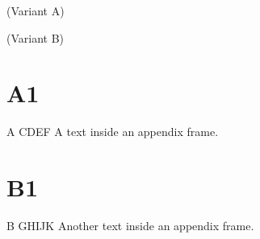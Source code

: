 \documentclass[]{beamer}
\begin{document}
%
%
\appendix

\begin{frame}[plain]{\appendixname{} (Variant A)}
	\centering
	\appendixname
\end{frame}

\begin{frame}{\appendixname{} (Variant B)}
	\tableofcontents[hideallsubsections]
\end{frame}

%
%
\section{A1}

\begin{frame}{A CDEF}
	A text inside an appendix frame.
\end{frame}

%
%
\section{B1}

\begin{frame}{B GHIJK}
	Another text inside an appendix frame.
\end{frame}
\end{document}
